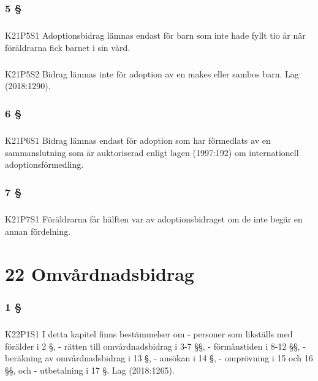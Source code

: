 \documentclass[a4paper,notitlepage,openany,10pt]{book}
\begin{document}
\subsection*{5 §}
\paragraph*{}
{\tiny K21P5S1}
Adoptionsbidrag lämnas endast för barn som inte hade fyllt tio år när föräldrarna fick barnet i sin vård.
\paragraph*{}
{\tiny K21P5S2}
Bidrag lämnas inte för adoption av en makes eller sambos barn.
Lag (2018:1290).
\subsection*{6 §}
\paragraph*{}
{\tiny K21P6S1}
Bidrag lämnas endast för adoption som har förmedlats av en sammanslutning som är auktoriserad enligt lagen (1997:192) om internationell adoptionsförmedling.
\subsection*{7 §}
\paragraph*{}
{\tiny K21P7S1}
Föräldrarna får hälften var av adoptionsbidraget om de inte begär en annan fördelning.
\chapter*{22 Omvårdnadsbidrag}
\subsection*{1 §}
\paragraph*{}
{\tiny K22P1S1}
I detta kapitel finns bestämmelser om
\newline - personer som likställs med förälder i 2 §,
\newline - rätten till omvårdnadsbidrag i 3-7 §§,
\newline - förmånstiden i 8-12 §§,
\newline - beräkning av omvårdnadsbidrag i 13 §,
\newline - ansökan i 14 §,
\newline - omprövning i 15 och 16 §§, och
\newline - utbetalning i 17 §.
Lag (2018:1265).
\end{document}
